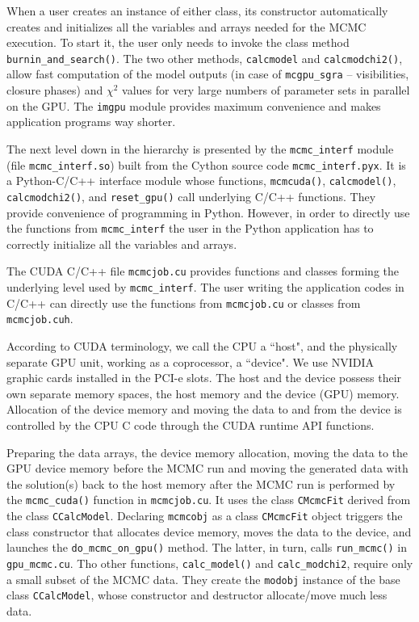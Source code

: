 \documentclass[preprint2]{aastex}
\begin{document}
When a user creates an instance of either class, its constructor automatically creates and initializes all the variables and arrays needed for the MCMC execution. To start it, the user only needs to invoke the class method \verb|burnin_and_search()|. The two other methods, \verb|calcmodel| and \verb|calcmodchi2()|, allow fast computation of the model outputs (in case of \verb|mcgpu_sgra| -- visibilities, closure phases) and $\chi^2$ values for very large numbers of parameter sets in parallel on the GPU. The \verb|imgpu| module provides maximum convenience and makes application programs way shorter.

The next level down in the hierarchy is presented by the \verb|mcmc_interf| module (file  \verb|mcmc_interf.so|) built from the Cython source code \verb|mcmc_interf.pyx|. It is a Python-C/C++ interface module whose functions, \verb|mcmcuda()|,   \verb|calcmodel()|,   \verb|calcmodchi2()|, and  \verb|reset_gpu()| call underlying C/C++ functions. They provide convenience of programming in Python. However, in order to directly use the functions from \verb|mcmc_interf| the user in the Python application has to correctly initialize all the variables and arrays.  

The CUDA C/C++ file \verb|mcmcjob.cu| provides functions and classes forming the underlying level used by \verb|mcmc_interf|. The user writing the application codes in C/C++ can directly use the functions from \verb|mcmcjob.cu| or classes from \verb|mcmcjob.cuh|.    

According to CUDA terminology, we call the CPU a ``host", and the physically separate GPU unit,
working as a coprocessor, a ``device". We use NVIDIA graphic cards installed in
the PCI-e slots. The host and the device possess their own separate memory spaces, the host 
memory and the device (GPU) memory. Allocation of the device memory and moving the data to and from the device is controlled by the CPU C code through the CUDA runtime API functions.  

Preparing the data arrays, the device memory allocation, moving the data to the GPU device memory before 
the MCMC run and moving the generated data with the solution(s) back to the host memory after the MCMC run
is performed by the \verb|mcmc_cuda()| function in \verb|mcmcjob.cu|. It uses the class \verb|CMcmcFit| derived from the class \verb|CCalcModel|. Declaring \verb|mcmcobj| as a class \verb|CMcmcFit| object triggers the class constructor that allocates device memory, moves the data to the device, and launches the \verb|do_mcmc_on_gpu()| method. The latter, in turn, calls \verb|run_mcmc()| in \verb|gpu_mcmc.cu|. Tho other functions, \verb|calc_model()| and \verb|calc_modchi2|, require only a small subset of the MCMC data. They create the \verb|modobj| instance of the base class \verb|CCalcModel|, whose constructor and destructor allocate/move much less data. 
\end{document}
